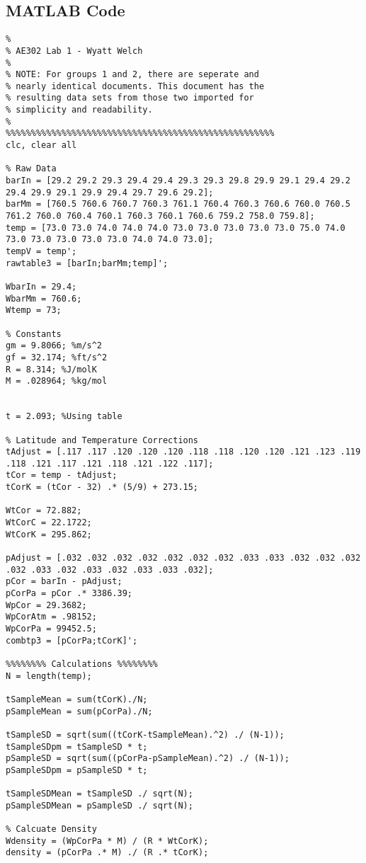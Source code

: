 \documentclass[conf]{new-aiaa}
\begin{document}
\pagebreak
\subsection{MATLAB Code}
\begin{lstlisting}[style=Matlab-editor]
%%%%%%%%%%%%%%%%%%%%%%%%%%%%%%%%%%%%%%%%%%%%%%%%%%%%%
%
% AE302 Lab 1 - Wyatt Welch
%
% NOTE: For groups 1 and 2, there are seperate and 
% nearly identical documents. This document has the 
% resulting data sets from those two imported for 
% simplicity and readability.
%
%%%%%%%%%%%%%%%%%%%%%%%%%%%%%%%%%%%%%%%%%%%%%%%%%%%%%
clc, clear all 

% Raw Data
barIn = [29.2 29.2 29.3 29.4 29.4 29.3 29.3 29.8 29.9 29.1 29.4 29.2 29.4 29.9 29.1 29.9 29.4 29.7 29.6 29.2];
barMm = [760.5 760.6 760.7 760.3 761.1 760.4 760.3 760.6 760.0 760.5 761.2 760.0 760.4 760.1 760.3 760.1 760.6 759.2 758.0 759.8];
temp = [73.0 73.0 74.0 74.0 74.0 73.0 73.0 73.0 73.0 73.0 75.0 74.0 73.0 73.0 73.0 73.0 73.0 74.0 74.0 73.0];
tempV = temp';
rawtable3 = [barIn;barMm;temp]';

WbarIn = 29.4;
WbarMm = 760.6;
Wtemp = 73;

% Constants
gm = 9.8066; %m/s^2
gf = 32.174; %ft/s^2
R = 8.314; %J/molK
M = .028964; %kg/mol


t = 2.093; %Using table

% Latitude and Temperature Corrections
tAdjust = [.117 .117 .120 .120 .120 .118 .118 .120 .120 .121 .123 .119 .118 .121 .117 .121 .118 .121 .122 .117];
tCor = temp - tAdjust;
tCorK = (tCor - 32) .* (5/9) + 273.15;

WtCor = 72.882;
WtCorC = 22.1722;
WtCorK = 295.862;

pAdjust = [.032 .032 .032 .032 .032 .032 .032 .033 .033 .032 .032 .032 .032 .033 .032 .033 .032 .033 .033 .032];
pCor = barIn - pAdjust;
pCorPa = pCor .* 3386.39;
WpCor = 29.3682;
WpCorAtm = .98152;
WpCorPa = 99452.5;
combtp3 = [pCorPa;tCorK]';

%%%%%%%% Calculations %%%%%%%%
N = length(temp);

tSampleMean = sum(tCorK)./N;
pSampleMean = sum(pCorPa)./N;

tSampleSD = sqrt(sum((tCorK-tSampleMean).^2) ./ (N-1));
tSampleSDpm = tSampleSD * t;
pSampleSD = sqrt(sum((pCorPa-pSampleMean).^2) ./ (N-1));
pSampleSDpm = pSampleSD * t;

tSampleSDMean = tSampleSD ./ sqrt(N);
pSampleSDMean = pSampleSD ./ sqrt(N);

% Calcuate Density
Wdensity = (WpCorPa * M) / (R * WtCorK);
density = (pCorPa .* M) ./ (R .* tCorK);


\end{lstlisting}
\end{document}
